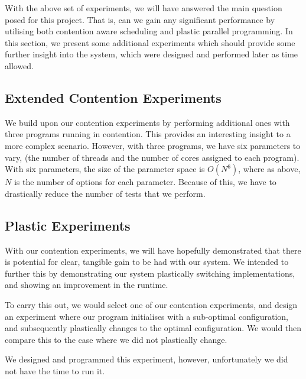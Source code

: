 With the above set of experiments, we will have answered the main question posed for this project. That is, can we gain any significant performance by utilising both contention aware scheduling and plastic parallel programming. In this section, we present some additional experiments which should provide some further insight into the system, which were designed and performed later as time allowed.



\subsection{Extended Contention Experiments}
\label{section:design:extended_contention_experiments}

We build upon our contention experiments by performing additional ones with three programs running in contention. This provides an interesting insight to a more complex scenario. However, with three programs, we have six parameters to vary, (the number of threads and the number of cores assigned to each program). With six parameters, the size of the parameter space is $O(N^6)$, where as above, $N$ is the number of options for each parameter. Because of this, we have to drastically reduce the number of tests that we perform.



\subsection{Plastic Experiments}
\label{section:design:plastic_experiment}

With our contention experiments, we will have hopefully demonstrated that there is potential for clear, tangible gain to be had with our system. We intended to further this by demonstrating our system plastically switching implementations, and showing an improvement in the runtime. 

To carry this out, we would select one of our contention experiments, and design an experiment where our program initialises with a sub-optimal configuration, and subsequently plastically changes to the optimal configuration. We would then compare this to the case where we did not plastically change.

We designed and programmed this experiment, however, unfortunately we did not have the time to run it.